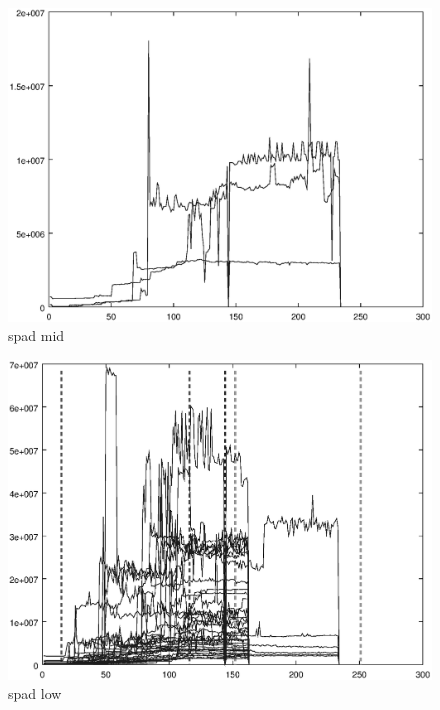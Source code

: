 \documentclass{article}
\begin{document}
\begin{figure}[h]
	\centering
	\includegraphics{measurement/spad_mid}
	\caption{spad mid}
	\label{fig:spad_mid}
\end{figure}

\begin{figure}[h]
	\centering
	\includegraphics{measurement/spad_low}
	\caption{spad low}
	\label{fig:spad_low}
\end{figure}
\end{document}
